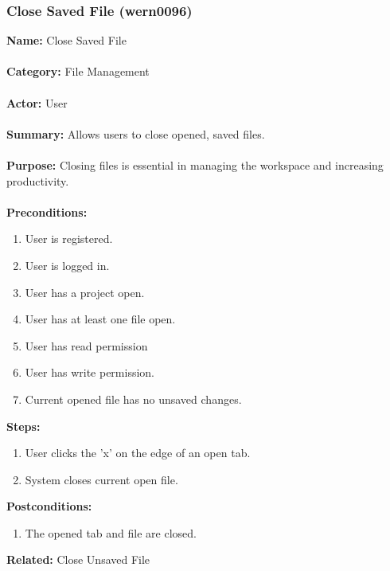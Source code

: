 \documentclass[11pt]{report}
\begin{document}
\newpage

\subsubsection{Close Saved File (wern0096)}
\begin{framed}
	\noindent\textbf{Name:} Close Saved File \\ \\
	\textbf{Category:} File Management \\ \\
	\textbf{Actor:} User \\ \\
	\textbf{Summary:} Allows users to close opened, saved files. \\ \\
	\textbf{Purpose:} Closing files is essential in managing the workspace and increasing productivity. \\ \\
	\textbf{Preconditions:} 
	\begin{enumerate}
		\item User is registered.
		\item User is logged in.
		\item User has a project open.
		\item User has at least one file open.
		\item User has read permission
		\item User has write permission.
		\item Current opened file has no unsaved changes.
	\end{enumerate}		
	\textbf{Steps:}
	\begin{enumerate}
		\item User clicks the 'x' on the edge of an open tab.
		\item System closes current open file.
	\end{enumerate}	
	\textbf{Postconditions:}
	\begin{enumerate}
		\item The opened tab and file are closed.
	\end{enumerate}
	\textbf{Related:} Close Unsaved File
\end{framed}

\newpage
\end{document}

